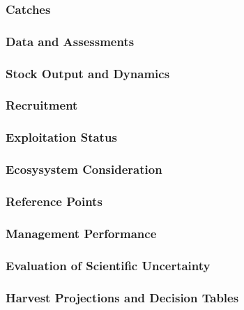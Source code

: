 \documentclass[
]{scrartcl}
\begin{document}
\subsubsection{Catches}\label{catches}

\subsubsection{Data and Assessments}\label{data-and-assessments}

\subsubsection{Stock Output and
Dynamics}\label{stock-output-and-dynamics}

\subsubsection{Recruitment}\label{recruitment}

\subsubsection{Exploitation Status}\label{exploitation-status}

\subsubsection{Ecosysystem
Consideration}\label{ecosysystem-consideration}

\subsubsection{Reference Points}\label{reference-points}

\subsubsection{Management Performance}\label{management-performance}

\subsubsection{Evaluation of Scientific
Uncertainty}\label{evaluation-of-scientific-uncertainty}

\subsubsection{Harvest Projections and Decision
Tables}\label{harvest-projections-and-decision-tables}
\end{document}
